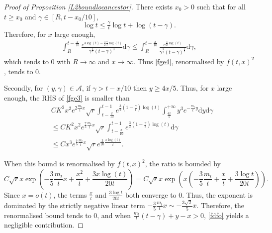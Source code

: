 \documentclass{article}
\begin{document}
\begin{proof}[Proof of Proposition \ref{L2boundlocancestor}]
There exists \( x_0 > 0 \) such that for all \( t \geq x_0 \) and \( \gamma \in [R, t - x_0/10] \),
\begin{equation*}
    \log t \leq \tfrac{\gamma}{t}\log t + \log(t - \gamma).
\end{equation*}
Therefore, for $x$ large enough,
\begin{equation}
    \begin{split}
         \int_R^{t-\frac{x}{10}} \frac{e^{3\log(t)-\frac{3}{2}\frac{\gamma}{t}\log(t)}}{\gamma^{\frac{3}{2}}(t-\gamma)^{3}}\mathrm{d}\gamma\leq \int_R^{t-\frac{x}{10}} \frac{e^{\frac{3}{2}\log(t)}}{\gamma^{\frac{3}{2}}(t-\gamma)^{\frac{3}{2}}}\mathrm{d}\gamma,
    \end{split}
\end{equation}
which tends to 0 with $R\to \infty$ and $x\to \infty$.
Thus \eqref{fge4}, renormalised by $f(t,x)^2$, tends to $0$.


 Secondly, for $(y, \gamma) \in \mathcal{A}$, if $\gamma > t - x/10$ then $y \geq 4x/5$. Thus, for $x$ large enough, the RHS of \eqref{fge3} is smaller than
\begin{equation}
\begin{split}
        & CK^2 x^2e^{2\frac{m_t}{t}x}\sqrt{r}\int_{t-\frac{x}{10}}^{t-1} e^{\frac{3}{2}(1-\frac{\gamma}{t})\log(t)}\int_{\frac{4x}{5}}^{+\infty}y^3e^{-\frac{m_t}{t}y}\mathrm{d}y\mathrm{d}\gamma\\
        & \leq C K^2 x^2e^{\frac{7}{5}\frac{m_t}{t}x}\sqrt{r}\int_{t-\frac{x}{10}}^{t-1} e^{\frac{3}{2}(1-\frac{\gamma}{t})\log(t)}\mathrm{d}\gamma\\
        &\leq Cx^3e^{\frac{7}{5}\frac{m_t}{t}x}\sqrt{r}e^{\frac{3}{20}\frac{x\log(t)}{t}}.
\end{split}
\end{equation}

When this bound is renormalised by $f(t,x)^2$, the ratio is bounded by
\begin{equation*}
    C \sqrt{r} x \exp\left( -\frac{3}{5}\frac{m_t}{t}x + \frac{x^2}{t} + \frac{3x\log(t)}{20 t} \right) = C \sqrt{r} x \exp\left( x\left( -\frac{3}{5}\frac{m_t}{t} + \frac{x}{t} + \frac{3\log t}{20 t} \right) \right).
\end{equation*}
Since $x = o(t)$, the terms $\frac{x}{t}$ and $\frac{3\log t}{20 t}$ both converge to $0$. Thus, the exponent is dominated by the strictly negative linear term $-\frac{3}{5}\frac{m_t}{t}x \sim -\frac{3\sqrt{2}}{5}x$. Therefore, the renormalised bound tends to $0$, and when $\frac{m_t}{t}(t-\gamma) +y -x > 0$, \eqref{fdfo} yields a negligible contribution.
\end{proof}



\end{document}
